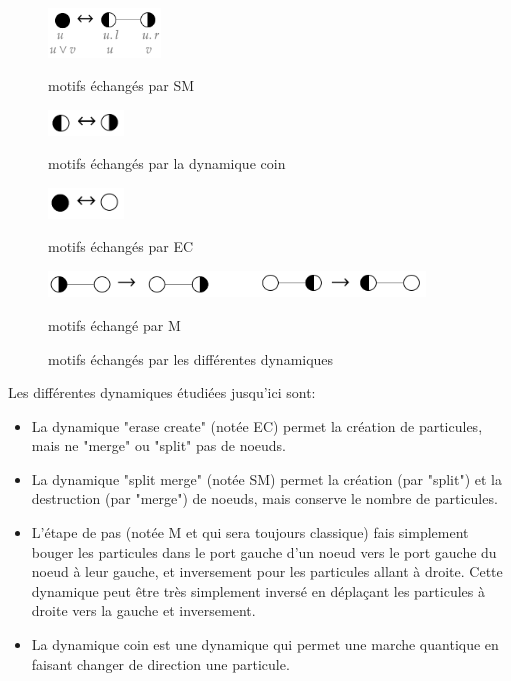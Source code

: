 \documentclass[11pts,french]{article}
\begin{document}
\begin{figure}[ht]
\begin{minipage}{0.50\textwidth}
\centering
\includegraphics[width=3cm]{split_merge}
\caption{motifs échangés par SM}
\end{minipage}
\begin{minipage}{0.50\textwidth}
\vspace*{0.4cm}
\centering\includegraphics[width=2cm]{coin}
\vspace*{0.2cm}
\caption{motifs échangés par la dynamique coin}
\end{minipage}


\vspace*{0cm} %

\begin{minipage}{0.40\textwidth}
\centering
\includegraphics[width=2cm]{erase_create}
\caption{motifs échangés par EC}
\end{minipage}
\begin{minipage}{0.60\textwidth}
\centering
\includegraphics[width=10cm]{move}
\caption{motifs échangé par M}
\end{minipage}

\captionsetup{labelformat=empty}
\caption{motifs échangés par les différentes dynamiques}

\end{figure}

Les différentes dynamiques étudiées jusqu'ici sont:

\begin{itemize}
\itemsep0em
    \item La dynamique "erase create" (notée EC) permet la création de particules, mais ne "merge" ou "split" pas de noeuds.
    
    \item La dynamique "split merge" (notée SM) permet la création (par "split") et la destruction (par "merge") de noeuds, mais conserve le nombre de particules.
    
    \item L'étape de pas (notée M et qui sera toujours classique) fais simplement bouger les particules dans le port gauche d'un noeud vers le port gauche du noeud à leur gauche, et inversement pour les particules allant à droite. Cette dynamique peut être très simplement inversé en déplaçant les particules à droite vers la gauche et inversement.
    
    \item La dynamique coin est une dynamique qui permet une marche quantique en faisant changer de direction une particule.
\end{itemize}
\end{document}
